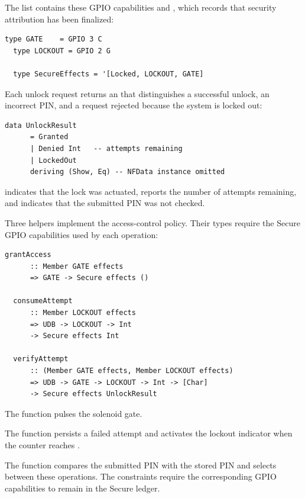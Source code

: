 \documentclass[sigconf]{acmart}
\begin{document}
The  list contains these GPIO capabilities and , which records that security attribution has been finalized:

\begin{lstlisting}[style=haskell]
  type GATE    = GPIO 3 C
  type LOCKOUT = GPIO 2 G

  type SecureEffects = '[Locked, LOCKOUT, GATE]
\end{lstlisting}

Each unlock request returns an  that distinguishes a successful unlock, an incorrect PIN, and a request rejected because the system is locked out:

\begin{lstlisting}[style=haskell]
  data UnlockResult
      = Granted
      | Denied Int   -- attempts remaining
      | LockedOut
      deriving (Show, Eq) -- NFData instance omitted
\end{lstlisting}

 indicates that the lock was actuated,  reports the number of attempts remaining, and  indicates that the submitted PIN was not checked.

Three helpers implement the access-control policy.
Their types require the Secure GPIO capabilities used by each operation:

\begin{lstlisting}[style=haskell]
  grantAccess
      :: Member GATE effects
      => GATE -> Secure effects ()

  consumeAttempt
      :: Member LOCKOUT effects
      => UDB -> LOCKOUT -> Int
      -> Secure effects Int

  verifyAttempt
      :: (Member GATE effects, Member LOCKOUT effects)
      => UDB -> GATE -> LOCKOUT -> Int -> [Char]
      -> Secure effects UnlockResult
\end{lstlisting}

The function  pulses the solenoid gate.

The function  persists a failed attempt and activates the lockout indicator when the counter reaches .

The function  compares the submitted PIN with the stored PIN and selects between these operations.
The  constraints require the corresponding GPIO capabilities to remain in the Secure ledger.
\end{document}
